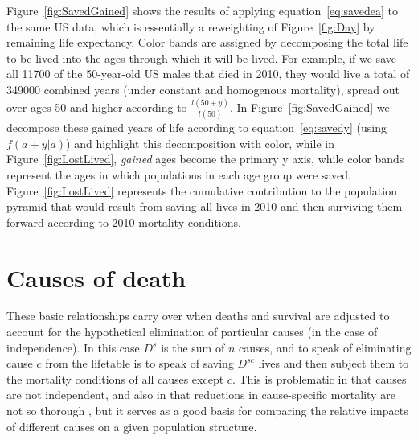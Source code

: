 \documentclass{article}
\begin{document}
Figure~\ref{fig:SavedGained} shows the results of applying
equation~\eqref{eq:savedea} to the same US data, which is essentially a
reweighting of Figure~\ref{fig:Day} by remaining life expectancy. Color bands
are assigned by decomposing the total life to be lived into the ages through
which it will be lived. For example, if we save all 11700 of the 50-year-old US
males that died in 2010, they would live a total of 349000 combined years (under constant and
homogenous mortality), spread out over ages 50 and higher according to $\frac{l(50+y)}{l(50)}$. In Figure~\ref{fig:SavedGained} we decompose these
gained years of life according to equation~\eqref{eq:savedy} (using $f(a+y|a)$)
and highlight this decomposition with color, while in Figure~\ref{fig:LostLived}, \textit{gained} ages become the primary y axis,
while color bands represent the ages in which populations in each age group were
saved. Figure~\ref{fig:LostLived} represents the cumulative contribution to the
population pyramid that would result from saving all lives in 2010 and then
surviving them forward according to 2010 mortality conditions.

\section*{Causes of death}

These basic relationships carry over when deaths and survival are adjusted to
account for the hypothetical elimination of particular causes (in the case of
independence). In this case $D^s$ is the sum of $n$ causes, and to speak of
eliminating cause $c$ from the lifetable is to speak of saving $D^{sc}$ lives and then
subject them to the mortality conditions of all causes except $c$.
This is problematic in that causes are not independent, and also in that
reductions in cause-specific mortality are not so thorough , but it serves as a
good basis for comparing the relative impacts of different causes on a given population structure.
\end{document}
